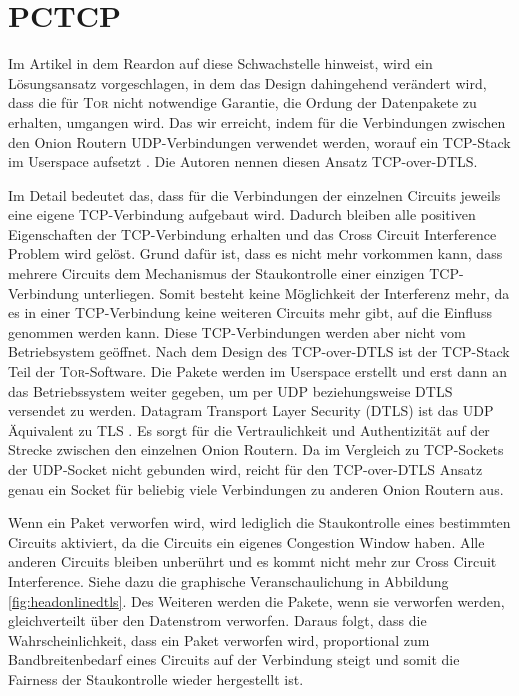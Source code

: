 \documentclass[fleqn,envcountsame,runningheads,10pt,a4paper]{llncs}
\begin{document}
\section{PCTCP}
\label{sec:pctcp}

Im Artikel in dem Reardon auf diese Schwachstelle hinweist, wird ein Lösungsansatz vorgeschlagen, in dem das Design dahingehend verändert wird, dass die für \textsc{Tor} nicht notwendige Garantie, die Ordung der Datenpakete zu erhalten, umgangen wird. Das wir erreicht, indem für die Verbindungen zwischen den Onion Routern UDP-Verbindungen verwendet werden, worauf ein TCP-Stack im Userspace aufsetzt \cite{tcp-over-dtls}. Die Autoren nennen diesen Ansatz TCP-over-DTLS.

Im Detail bedeutet das, dass für die Verbindungen der einzelnen Circuits jeweils eine eigene TCP-Verbindung aufgebaut wird. Dadurch bleiben alle positiven Eigenschaften der TCP-Verbindung erhalten und das Cross Circuit Interference Problem wird gelöst. Grund dafür ist, dass es nicht mehr vorkommen kann, dass mehrere Circuits dem Mechanismus der Staukontrolle einer einzigen TCP-Verbindung unterliegen. Somit besteht keine Möglichkeit der Interferenz mehr, da es in einer TCP-Verbindung keine weiteren Circuits mehr gibt, auf die Einfluss genommen werden kann. Diese TCP-Verbindungen werden aber nicht vom Betriebsystem geöffnet. Nach dem Design des TCP-over-DTLS ist der TCP-Stack Teil der \textsc{Tor}-Software. Die Pakete werden im Userspace erstellt und erst dann an das Betriebssystem weiter gegeben, um per UDP beziehungsweise DTLS versendet zu werden. Datagram Transport Layer Security (DTLS) ist das UDP Äquivalent zu TLS \cite{dtls}. Es sorgt für die Vertraulichkeit und Authentizität auf der Strecke zwischen den einzelnen Onion Routern. Da im Vergleich zu TCP-Sockets der UDP-Socket nicht gebunden wird, reicht für den TCP-over-DTLS Ansatz genau ein Socket für beliebig viele Verbindungen zu anderen Onion Routern aus.

Wenn ein Paket verworfen wird, wird lediglich die Staukontrolle eines bestimmten Circuits aktiviert, da die Circuits ein eigenes Congestion Window haben. Alle anderen Circuits bleiben unberührt und es kommt nicht mehr zur Cross Circuit Interference. Siehe dazu die graphische Veranschaulichung in Abbildung \ref{fig:headonlinedtls}. Des Weiteren werden die Pakete, wenn sie verworfen werden, gleichverteilt über den Datenstrom verworfen. Daraus folgt, dass die Wahrscheinlichkeit, dass ein Paket verworfen wird, proportional zum Bandbreitenbedarf eines Circuits auf der Verbindung steigt und somit die Fairness der Staukontrolle wieder hergestellt ist.
\end{document}
